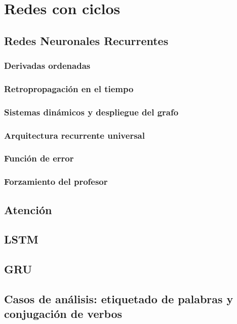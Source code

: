 \documentclass[12pt,openany]{book}
\begin{document}
\part{Redes con ciclos}
\chapter{Redes Neuronales Recurrentes}
\section{Derivadas ordenadas}
\section{Retropropagación en el tiempo}
\section{Sistemas dinámicos y despliegue del grafo}
\section{Arquitectura recurrente universal}
\section{Función de error}
\section{Forzamiento del profesor}

\chapter{Atención}
\chapter{LSTM}
\chapter{GRU}
\chapter{Casos de análisis: etiquetado de palabras y conjugación de verbos}
\end{document}
